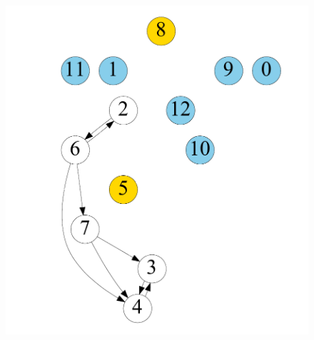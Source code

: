 \begin{figure}[t]
\begin{minipage}[b]{0.19\linewidth}
    \end{minipage}
    \begin{minipage}[b]{0.19\linewidth}
            \centering
            {\includegraphics[width=\textwidth]{./alg_fig/simple-g4}}
        \end{minipage}
    \begin{minipage}[b]{0.19\linewidth}
            \centering

\end{minipage}
\end{figure}
